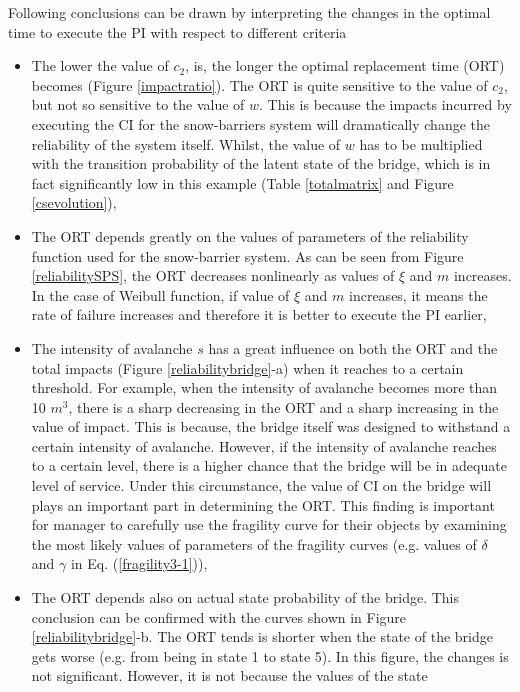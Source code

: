 \documentclass[]{article}
\begin{document}
Following conclusions can be drawn by interpreting the changes in the
optimal time to execute the PI with respect to different criteria
\begin{itemize}
\item The lower the value of $c_2$, is, the longer the optimal
replacement time (ORT) becomes (Figure \ref{impactratio}). The ORT
is quite sensitive to the value of $c_2$, but not so
sensitive to the value of $w$. This is because the
impacts incurred by executing the CI for the snow-barriers system
will dramatically change the reliability of the system itself. Whilst,
the value of $w$ has to be multiplied with the transition
probability of the latent state of the bridge, which is in fact significantly
low in this example (Table \ref{totalmatrix} and Figure \ref{csevolution}), 
\item The ORT depends greatly on the values of parameters of the reliability
function used for the snow-barrier system. As can be seen from Figure
\ref{reliabilitySPS}, the ORT decreases nonlinearly as values of $\xi$
and $m$ increases. In the case of Weibull function, if value of $\xi$
and $m$ increases, it means the rate of failure increases and therefore
it is better to execute the PI earlier, 
\item The intensity of avalanche $s$ has a great influence on both the ORT and
the total impacts (Figure \ref{reliabilitybridge}-a) when it reaches
to a certain threshold. For example, when the intensity of avalanche
becomes more than 10 $m^{3}$, there is a sharp decreasing in the
ORT and a sharp increasing in the value of impact. This is because,
the bridge itself was designed to withstand a certain intensity of
avalanche. However, if the intensity of avalanche reaches to a certain
level, there is a higher chance that the bridge will be in adequate
level of service. Under this circumstance, the value of CI on the
bridge will plays an important part in determining the ORT. This finding
is important for manager to carefully use the fragility curve for
their objects by examining the most likely values of parameters of
the fragility curves (e.g. values of $\delta$ and $\gamma$ in Eq.
(\ref{fragility3-1})), 
\item The ORT depends also on actual state probability of the bridge. This
conclusion can be confirmed with the curves shown in Figure \ref{reliabilitybridge}-b.
The ORT tends is shorter when the state of the bridge gets worse (e.g.
from being in state 1 to state 5). In this figure, the changes is
not significant. However, it is not because the values of the state

\end{itemize}
\end{document}
